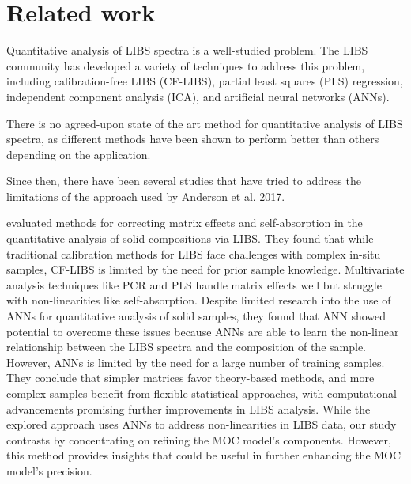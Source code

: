 \section{Related work}\label{sec:related_works}


Quantitative analysis of LIBS spectra is a well-studied problem.
The LIBS community has developed a variety of techniques to address this problem, including calibration-free LIBS (CF-LIBS), partial least squares (PLS) regression, independent component analysis (ICA), and artificial neural networks (ANNs).

There is no agreed-upon state of the art method for quantitative analysis of LIBS spectra, as different methods have been shown to perform better than others depending on the application.


Since then, there have been several studies that have tried to address the limitations of the approach used by Anderson et al. 2017.

\citeauthor{takahashi_quantitative_2017} \cite{takahashi_quantitative_2017} evaluated methods for correcting matrix effects and self-absorption in the quantitative analysis of solid compositions via LIBS.
They found that while traditional calibration methods for LIBS face challenges with complex in-situ samples, CF-LIBS is limited by the need for prior sample knowledge.
Multivariate analysis techniques like PCR and PLS handle matrix effects well but struggle with non-linearities like self-absorption.
Despite limited research into the use of ANNs for quantitative analysis of solid samples, they found that ANN showed potential to overcome these issues because ANNs are able to learn the non-linear relationship between the LIBS spectra and the composition of the sample.
However, ANNs is limited by the need for a large number of training samples.
They conclude that simpler matrices favor theory-based methods, and more complex samples benefit from flexible statistical approaches, with computational advancements promising further improvements in LIBS analysis. 
While the explored approach uses ANNs to address non-linearities in LIBS data, our study contrasts by concentrating on refining the MOC model's components. However, this method provides insights that could be useful in further enhancing the MOC model's precision.

